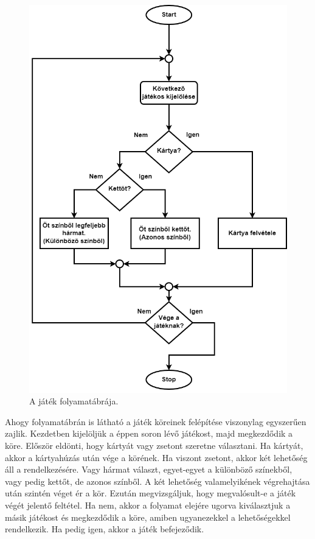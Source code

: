 

\begin{figure}[h]
\centering
\includegraphics[scale=0.3]{images/flowchart.png}
\caption{A játék folyamatábrája.}
\label{fig:flowchart}
\end{figure}


Ahogy folyamatábrán is látható a játék köreinek felépítése viszonylag egyszerűen zajlik. Kezdetben kijelöljük a éppen soron lévő játékost, majd megkezdődik a köre. Először eldönti, hogy kártyát vagy zsetont szeretne választani. Ha kártyát, akkor a kártyahúzás után vége a körének. Ha viszont zsetont, akkor két lehetőség áll a rendelkezésére. Vagy hármat választ, egyet-egyet a különböző színekből, vagy pedig kettőt, de azonos színből. A két lehetőség valamelyikének végrehajtása után szintén véget ér a kör. Ezután megvizsgáljuk, hogy megvalósult-e a játék végét jelentő feltétel. Ha nem, akkor a folyamat elejére ugorva kiválasztjuk a másik játékost és megkezdődik a köre, amiben ugyanezekkel a lehetőségekkel rendelkezik. Ha pedig igen, akkor a játék befejeződik.\par

